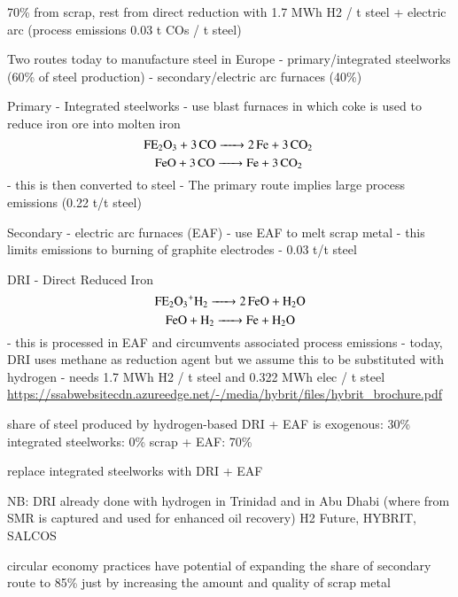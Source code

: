 
70\% from scrap, rest from direct reduction with 1.7 MWh H2 / t steel + electric arc (process emissions 0.03 t COs / t steel)

Two routes today to manufacture steel in Europe
- primary/integrated steelworks (60\% of steel production)
- secondary/electric arc furnaces (40\%) 

Primary - Integrated steelworks
- use blast furnaces in which coke is used to reduce iron ore into molten iron
\begin{equation}
    \ce{FE2O3 + 3CO -> 2Fe + 3\co}
\end{equation}
\begin{equation}
    \ce{FeO + 3CO -> Fe + 3\co}
\end{equation}
- this is then converted to steel
- The primary route implies large process emissions (0.22 t\co/t steel)

Secondary - electric arc furnaces (EAF)
- use EAF to melt scrap metal
- this limits \co emissions to burning of graphite electrodes 
- 0.03 t\co/t steel

DRI - Direct Reduced Iron
\begin{equation}
    \ce{FE2O3+H2 -> 2FeO + H2O}
\end{equation}
\begin{equation}
    \ce{FeO + H2 -> Fe + H2O}
\end{equation}
- this is processed in EAF and circumvents associated process emissions
- today, DRI uses methane as reduction agent but we assume this to be substituted with hydrogen
- needs 1.7 MWh H2 / t steel  and 0.322 MWh elec / t steel \url{https://ssabwebsitecdn.azureedge.net/-/media/hybrit/files/hybrit_brochure.pdf}

share of steel produced by hydrogen-based DRI + EAF is exogenous: 30\%
integrated steelworks: 0\%
scrap + EAF: 70\%

replace integrated steelworks with DRI + EAF

NB: DRI already done with hydrogen in Trinidad and in Abu Dhabi (where \co from
SMR is captured and used for enhanced oil recovery) H2 Future, HYBRIT, SALCOS

 circular economy practices have potential of expanding
the share of secondary route to 85\% just by increasing the amount and quality of scrap metal

